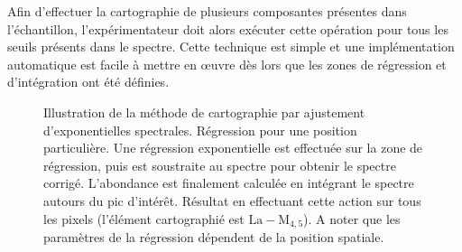     Afin d'effectuer la cartographie de plusieurs composantes présentes dans l'échantillon, l'expérimentateur doit alors exécuter cette opération pour tous les seuils présents dans le spectre. Cette technique est simple et une implémentation automatique est facile à mettre en \oe{}uvre dès lors que les zones de régression et d'intégration ont été définies.
    
    \begin{figure}[t]
        \centering
        \hspace{1em}
        \caption{Illustration de la méthode de cartographie par ajustement d'exponentielles spectrales. \protect{} Régression pour une position particulière. Une régression exponentielle est effectuée sur la zone de régression, puis est soustraite au spectre pour obtenir le spectre corrigé. L'abondance est finalement calculée en intégrant le spectre autours du pic d'intérêt. \protect{} Résultat en effectuant cette action sur tous les pixels (l'élément cartographié est $\mathrm{La-M}_{4, 5}$). A noter que les paramètres de la régression dépendent de la position spatiale.
            \protect\label{fig-carto-separation}}
    \end{figure}
    
